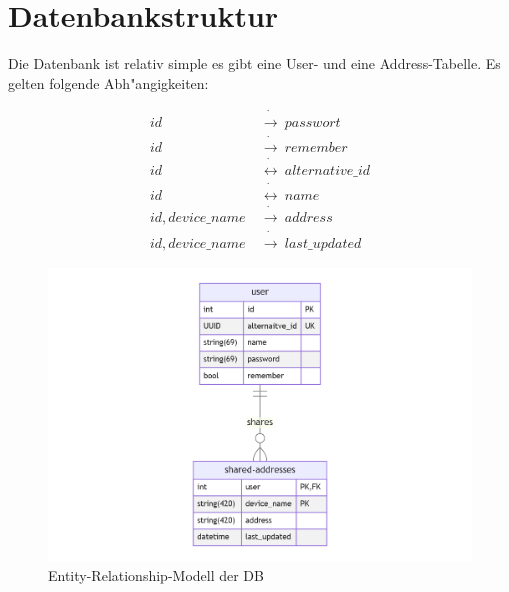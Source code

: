 \section{Datenbankstruktur}\label{sec:datenbankstruktur}
Die Datenbank ist relativ simple es gibt eine User- und eine Address-Tabelle.
Es gelten folgende Abh{"a}ngigkeiten:

\begin{align}
    id ~ &\dot \rightarrow ~ passwort \\
    id ~ &\dot \rightarrow ~ remember \\
    id ~ &\dot \leftrightarrow ~ alternative\_id \\
    id ~ &\dot \leftrightarrow ~ name \\
    id, device\_name ~ &\dot \rightarrow ~ address \\
    id, device\_name ~ &\dot \rightarrow ~ last\_updated
\end{align}


\begin{figure}[h]
    \centering
    \includegraphics[width=\textwidth]{db}
    \caption{Entity-Relationship-Modell der DB}
    \label{fig: db}
\end{figure}



